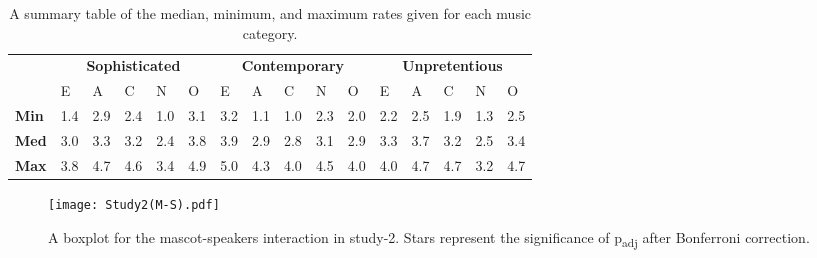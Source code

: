\begin{table}[hbt!]
    \renewcommand{\arraystretch}{1}
    \begin{center}
        \begin{tabular}{p{}|
        p{}|p{}|p{}|p{}|p{}||
        p{}|p{}|p{}|p{}|p{}||
        p{}|p{}|p{}|p{}|p{}|}
            \cline{2-16}
            & \multicolumn{5}{c||}{\textbf{Sophisticated}} & \multicolumn{5}{c||}{\textbf{Contemporary}}
            & \multicolumn{5}{c|}{\textbf{Unpretentious}} \\
            \cline{2-16}
            & E & A & C & N & O & E & A & C & N & O & E & A & C & N & O     \\
            \cline{2-16}
            \textbf{Min}    & 1.4 & 2.9 & 2.4 & 1.0 & 3.1 & 3.2 & 1.1 & 1.0 & 2.3 & 2.0 & 2.2 & 2.5 & 1.9 & 1.3 & 2.5  \\
            \textbf{Med}    & 3.0 & 3.3 & 3.2 & 2.4 & 3.8 & 3.9 & 2.9 & 2.8 & 3.1 & 2.9 & 3.3 & 3.7 & 3.2 & 2.5 & 3.4   \\
            \textbf{Max}    & 3.8 & 4.7 & 4.6 & 3.4 & 4.9 & 5.0 & 4.3 & 4.0 & 4.5 & 4.0 & 4.0 & 4.7 & 4.7 & 3.2 & 4.7 \\
            \cline{2-16}
        \end{tabular}
        \caption[]{A summary table of the median, minimum, and maximum rates given for each music category.\footnotemark}
        \label{table:medianMS2}
    \end{center}
\end{table}
\begin{figure}[hbt!]
    \centering
    \texttt{[image: Study2(M-S).pdf]}
    \caption[]{A boxplot for the mascot-speakers interaction in study-2.
    Stars represent the significance of p\textsubscript{adj} after Bonferroni correction.\footnotemark}
    \label{fig:MS2}
\end{figure}
